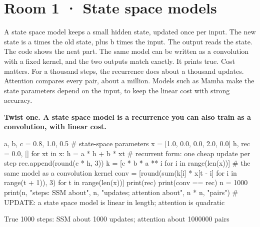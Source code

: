 \documentclass[11pt,a4paper]{report}
\begin{document}
\section*{Room 1 · State space models}
A state space model keeps a small hidden state, updated once per input. The new state is a times the old state, plus b times the input. The output reads the state. The code shows the neat part. The same model can be written as a convolution with a fixed kernel, and the two outputs match exactly. It prints true. Cost matters. For a thousand steps, the recurrence does about a thousand updates. Attention compares every pair, about a million. Models such as Mamba make the state parameters depend on the input, to keep the linear cost with strong accuracy.
\begin{tcolorbox}[colback=yellow!12,colframe=orange!70!black,boxrule=0.4pt,left=4pt,right=4pt,top=2pt,bottom=2pt]\textbf{Twist one. A state space model is a recurrence you can also train as a convolution, with linear cost.}\end{tcolorbox}
\begin{Code}
a, b, c = 0.8, 1.0, 0.5                     # state-space parameters
x = [1.0, 0.0, 0.0, 2.0, 0.0]
h, rec = 0.0, []
for xt in x:
    h = a * h + b * xt                      # recurrent form: one cheap update per step
    rec.append(round(c * h, 3))
k = [c * b * a ** i for i in range(len(x))] # the same model as a convolution kernel
conv = [round(sum(k[i] * x[t - i] for i in range(t + 1)), 3) for t in range(len(x))]
print(rec)
print(conv == rec)
n = 1000
print(n, "steps: SSM about", n, "updates; attention about", n * n, "pairs")
# UPDATE: a state space model is linear in length; attention is quadratic
\end{Code}
\begin{Out}
[0.5, 0.4, 0.32, 1.256, 1.005]
True
1000 steps: SSM about 1000 updates; attention about 1000000 pairs
\end{Out}
\end{document}
